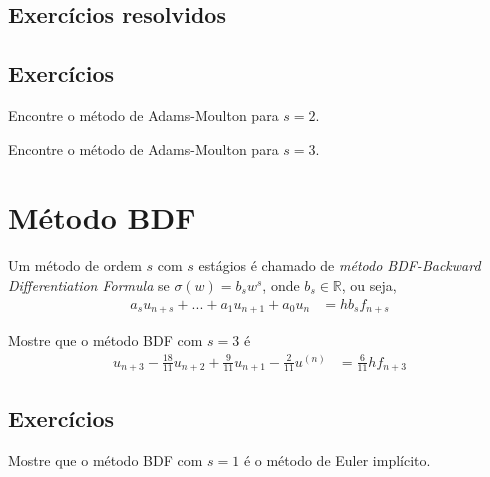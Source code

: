 \subsection*{Exercícios resolvidos}

\emconstrucao

\subsection*{Exercícios}

\begin{exer}
Encontre o método de Adams-Moulton para $s=2$.
\end{exer}

\begin{exer}
Encontre o método de Adams-Moulton para $s=3$.
\end{exer}

\section{Método BDF}
Um método de ordem $s$ com $s$ estágios é chamado de \emph{método BDF-Backward Differentiation Formula} se $\sigma (w)=b_sw^s$, onde $b_s \in \mathbb{R}$, ou seja,
\begin{eqnarray}\label{BDF}
  a_s u_{n+s}+ ...+ a_1 u_{n+1} + a_0u_{n} &=  h b_sf_{n+s}
\end{eqnarray}

\begin{ex}
Mostre que o método BDF com $s=3$ é
\begin{eqnarray}
  u_{n+3} -\frac{18}{11} u_{n+2}+\frac{9}{11}u_{n+1}-\frac{2}{11}u^{(n)} &= \frac{6}{11}h f_{n+3}
\end{eqnarray}
\end{ex}

\subsection*{Exercícios}

\begin{exer}
Mostre que o método BDF com $s=1$ é o método de Euler implícito.
\end{exer}

